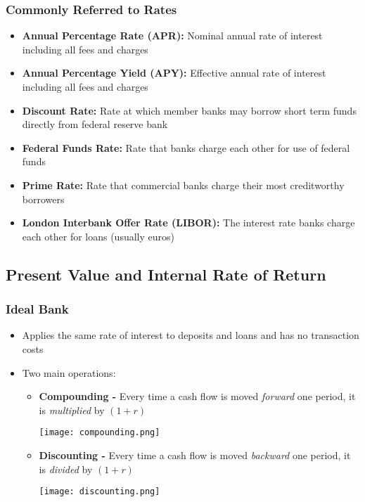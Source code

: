 \documentclass[11pt]{article}
\begin{document}
\subsubsection{Commonly Referred to Rates}
\begin{itemize}
\item \textbf{Annual Percentage Rate (APR):} Nominal annual rate of interest including all fees and charges
\item \textbf{Annual Percentage Yield (APY):} Effective annual rate of interest including all fees and charges
\item \textbf{Discount Rate:} Rate at which member banks may borrow short term funds directly from federal reserve bank 
\item \textbf{Federal Funds Rate:} Rate that banks charge each other for use of federal funds
\item \textbf{Prime Rate:} Rate that commercial banks charge their most creditworthy borrowers
\item \textbf{London Interbank Offer Rate (LIBOR):} The interest rate banks charge each other for loans (usually euros)
\end{itemize}
\pagebreak

\subsection{Present Value and Internal Rate of Return}
\subsubsection{Ideal Bank}
\begin{itemize}
\item Applies the same rate of interest to deposits and loans and has no transaction costs 
\item Two main operations:
\begin{itemize}
\item \textbf{Compounding -} Every time a cash flow is moved \textit{forward} one period, it is \textit{multiplied} by $(1+r)$
\begin{center}
\texttt{[image: compounding.png]} 
\end{center}
\item \textbf{Discounting -} Every time a cash flow is moved \textit{backward} one period, it is \textit{divided} by $(1+r)$
\begin{center}
\texttt{[image: discounting.png]} 
\end{center}
\end{itemize}
\end{itemize}
\end{document}
